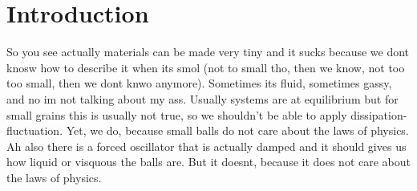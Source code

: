 \section{Introduction}

So you see actually materials can be made very tiny and it sucks because we dont knosw how to describe it when its smol (not to small tho, then we know, not too too small, then we dont knwo anymore). Sometimes its fluid, sometimes gassy, and no im not talking about my ass. Usually systems are at equilibrium but for small grains this is usually not true, so we shouldn't be able to apply dissipation-fluctuation. Yet, we do, because small balls do not care about the laws of physics. Ah also there is a forced oscillator that is actually damped and it should gives us how liquid or visquous the balls are. But it doesnt, because it does not care about the laws of physics.